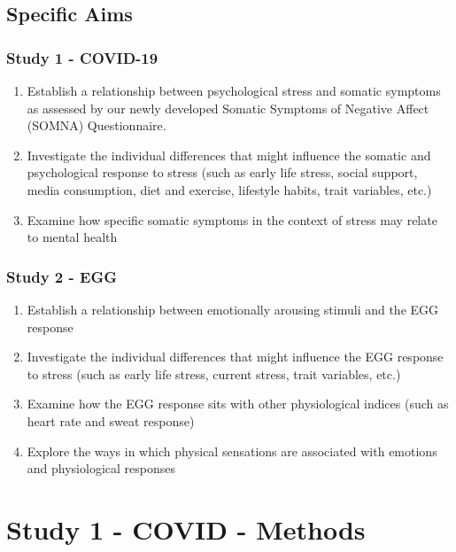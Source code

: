 \documentclass[]{book}
\providecommand{\tightlist}{%
  \setlength{\itemsep}{0pt}\setlength{\parskip}{0pt}}
\begin{document}
\hypertarget{specific-aims}{%
\section{Specific Aims}\label{specific-aims}}

\hypertarget{study-1---covid-19-1}{%
\subsection{Study 1 - COVID-19}\label{study-1---covid-19-1}}

\begin{enumerate}
\def\labelenumi{\arabic{enumi}.}
\tightlist
\item
  Establish a relationship between psychological stress and somatic symptoms as assessed by our newly developed Somatic Symptoms of Negative Affect (SOMNA) Questionnaire.
\item
  Investigate the individual differences that might influence the somatic and psychological response to stress (such as early life stress, social support, media consumption, diet and exercise, lifestyle habits, trait variables, etc.)
\item
  Examine how specific somatic symptoms in the context of stress may relate to mental health
\end{enumerate}

\hypertarget{study-2---egg-1}{%
\subsection{Study 2 - EGG}\label{study-2---egg-1}}

\begin{enumerate}
\def\labelenumi{\arabic{enumi}.}
\tightlist
\item
  Establish a relationship between emotionally arousing stimuli and the EGG response
\item
  Investigate the individual differences that might influence the EGG response to stress (such as early life stress, current stress, trait variables, etc.)
\item
  Examine how the EGG response sits with other physiological indices (such as heart rate and sweat response)
\item
  Explore the ways in which physical sensations are associated with emotions and physiological responses
\end{enumerate}

\hypertarget{study-1---covid---methods}{%
\chapter{Study 1 - COVID - Methods}\label{study-1---covid---methods}}
\end{document}
